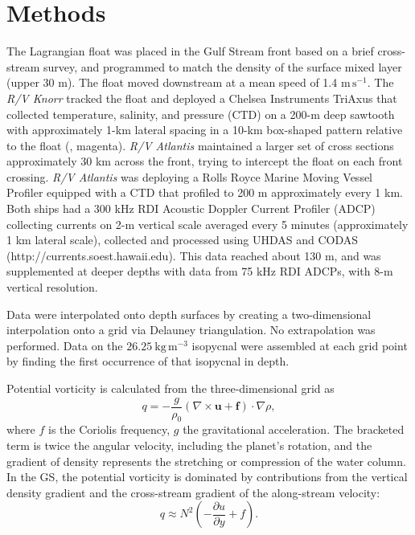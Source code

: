 \documentclass{natureJMK}
\begin{document}
\section{Methods}

The Lagrangian float was placed in the Gulf Stream front based on a brief cross-stream survey, and programmed to match the density of the surface mixed layer (upper 30 m).  The float moved downstream at a mean speed of 1.4 $\mathrm{m\,s^{-1}}$.  The \emph{R/V Knorr} tracked the float and deployed a Chelsea Instruments TriAxus that  collected temperature, salinity, and pressure (CTD) on a 200-m deep sawtooth with approximately 1-km lateral spacing in a 10-km box-shaped pattern relative to the float (, magenta).  \emph{R/V Atlantis} maintained a larger set of cross sections approximately 30 km across the front, trying to intercept the float on each front crossing.  \emph{R/V Atlantis} was deploying a Rolls Royce Marine Moving Vessel Profiler equipped with a CTD that profiled to 200 m approximately every 1 km.  Both ships had a 300 kHz RDI Acoustic Doppler Current Profiler (ADCP) collecting currents on 2-m vertical scale averaged every 5 minutes (approximately 1 km lateral scale), collected and processed using UHDAS and CODAS (http://currents.soest.hawaii.edu\cite{firingetal12}).  This data reached about 130 m, and was supplemented at deeper depths with data from 75 kHz RDI ADCPs, with 8-m vertical resolution.  

Data were interpolated onto depth surfaces by creating a two-dimensional interpolation onto a grid via Delauney triangulation. No extrapolation was performed.  Data on the $26.25\ \mathrm{kg\,m^{-3}}$ isopycnal were assembled at each grid point by finding the first occurrence of that isopycnal in depth.  

Potential vorticity is calculated from the three-dimensional grid as
\begin{equation}
  q = -\frac{g}{\rho_0}\left(\nabla \times\mathbf{u}+\mathbf{f}\right) \cdot \nabla\rho,
\end{equation}
where $f$ is the Coriolis frequency, $g$ the gravitational acceleration. The bracketed term is twice the angular velocity, including the planet's rotation, and the gradient of density represents the stretching or compression of the water column.  In the GS, the potential vorticity is dominated by contributions from the vertical density gradient and the cross-stream gradient of the along-stream velocity:
\begin{equation}
  q \approx N^2\left(-\frac{\partial u}{\partial y}+f\right).
\end{equation}
\end{document}
